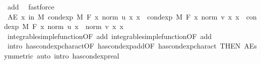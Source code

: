 \begin{isabellebody}
\ add{\isacharparenleft}{\kern0pt}{}{\isacharcomma}{\kern0pt}{}{\isacharparenright}{\kern0pt}\ \isamarkupfalse%
\ fastforce\isanewline
\ \ \isamarkupfalse%
\ \isamarkupfalse%
\ {\isachardoublequoteopen}AE\ x\ in\ M{\isachardot}{\kern0pt}\ cond{\isacharunderscore}{\kern0pt}exp\ M\ F\ {\isacharparenleft}{\kern0pt}{\isasymlambda}x{\isachardot}{\kern0pt}\ norm\ {\isacharparenleft}{\kern0pt}u\ x{\isacharparenright}{\kern0pt}{\isacharparenright}{\kern0pt}\ x\ {\isacharplus}{\kern0pt}\ cond{\isacharunderscore}{\kern0pt}exp\ M\ F\ {\isacharparenleft}{\kern0pt}{\isasymlambda}x{\isachardot}{\kern0pt}\ norm\ {\isacharparenleft}{\kern0pt}v\ x{\isacharparenright}{\kern0pt}{\isacharparenright}{\kern0pt}\ x\ {\isacharequal}{\kern0pt}\ cond{\isacharunderscore}{\kern0pt}exp\ M\ F\ {\isacharparenleft}{\kern0pt}{\isasymlambda}x{\isachardot}{\kern0pt}\ norm\ {\isacharparenleft}{\kern0pt}u\ x{\isacharparenright}{\kern0pt}\ {\isacharplus}{\kern0pt}\ norm\ {\isacharparenleft}{\kern0pt}v\ x{\isacharparenright}{\kern0pt}{\isacharparenright}{\kern0pt}\ x{\isachardoublequoteclose}\ \isamarkupfalse%
\ integrable{\isacharunderscore}{\kern0pt}simple{\isacharunderscore}{\kern0pt}function{\isacharbrackleft}{\kern0pt}OF\ add{\isacharparenleft}{\kern0pt}{}{\isacharcomma}{\kern0pt}{}{\isacharparenright}{\kern0pt}{\isacharbrackright}{\kern0pt}\ integrable{\isacharunderscore}{\kern0pt}simple{\isacharunderscore}{\kern0pt}function{\isacharbrackleft}{\kern0pt}OF\ add{\isacharparenleft}{\kern0pt}{}{\isacharcomma}{\kern0pt}{}{\isacharparenright}{\kern0pt}{\isacharbrackright}{\kern0pt}\ \isamarkupfalse%
\ {\isacharparenleft}{\kern0pt}intro\ has{\isacharunderscore}{\kern0pt}cond{\isacharunderscore}{\kern0pt}exp{\isacharunderscore}{\kern0pt}charact{\isacharparenleft}{\kern0pt}{}{\isacharparenright}{\kern0pt}{\isacharbrackleft}{\kern0pt}OF\ has{\isacharunderscore}{\kern0pt}cond{\isacharunderscore}{\kern0pt}exp{\isacharunderscore}{\kern0pt}add{\isacharbrackleft}{\kern0pt}OF\ has{\isacharunderscore}{\kern0pt}cond{\isacharunderscore}{\kern0pt}exp{\isacharunderscore}{\kern0pt}charact{\isacharparenleft}{\kern0pt}{}{\isacharcomma}{\kern0pt}{}{\isacharparenright}{\kern0pt}{\isacharbrackright}{\kern0pt}{\isacharcomma}{\kern0pt}\ THEN\ AE{\isacharunderscore}{\kern0pt}symmetric{\isacharbrackright}{\kern0pt}{\isacharcomma}{\kern0pt}\ auto\ intro{\isacharcolon}{\kern0pt}\ has{\isacharunderscore}{\kern0pt}cond{\isacharunderscore}{\kern0pt}exp{\isacharunderscore}{\kern0pt}real{\isacharparenright}{\kern0pt}\isanewline

\end{isabellebody}
